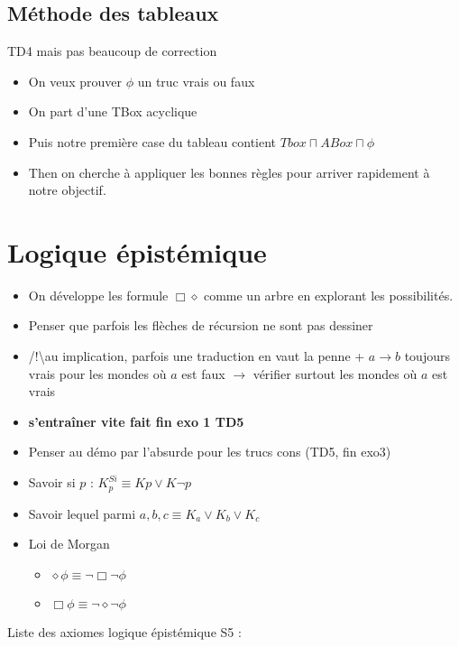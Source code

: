 \documentclass{article}
\theoremstyle{plain}%
\theoremstyle{definition}
\theoremstyle{remark}
\begin{document}
\subsection{Méthode des tableaux}
TD4 mais pas beaucoup de correction
\begin{itemize}
    \item On veux prouver $ \phi  $  un truc vrais ou faux
    \item On part d'une TBox acyclique
    \item Puis notre première case du tableau contient $ Tbox \sqcap ABox \sqcap \phi  $ 
    \item Then on cherche à appliquer les bonnes règles pour arriver rapidement à notre objectif.
\end{itemize}

\section{Logique épistémique}
\begin{itemize}
    \item On développe les formule $ \Box \diamond  $ comme un arbre en explorant les possibilités.
    \item Penser que parfois les flèches de récursion ne sont pas dessiner
    \item /!\textbackslash au implication, parfois une traduction en vaut la penne + $ a \to b $ toujours vrais pour les mondes où $ a $ est faux $\rightarrow$ vérifier surtout les mondes où $ a $ est vrais
    \item \textbf{s'entraîner vite fait fin exo 1 TD5}
    \item Penser au démo par l'absurde pour les trucs cons (TD5, fin exo3)
    \item Savoir si $ p $ :  $ K^{Si}_p \equiv K p \vee K \neg p $ 
    \item Savoir lequel parmi $ a,b,c \equiv K_a \vee K_b \vee K_c $ 
    \item Loi de Morgan \begin{itemize}
        \item $ \diamond \phi \equiv \neg \Box \neg \phi  $ 
        \item $ \Box \phi \equiv \neg \diamond \neg \phi  $ 
    \end{itemize}
\end{itemize}
Liste des axiomes logique épistémique S5 :
\end{document}
